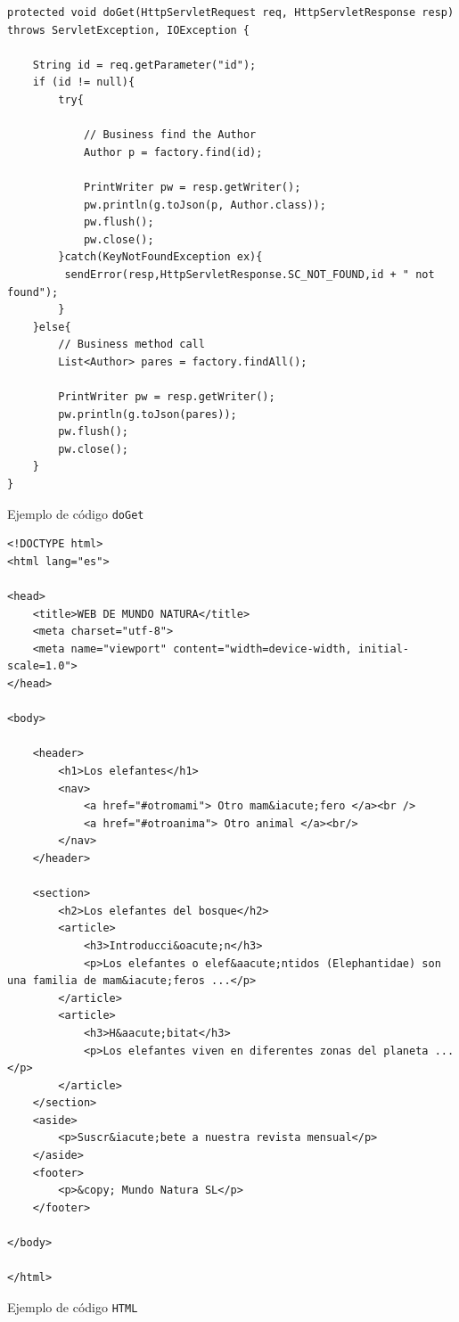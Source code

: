 \documentclass{twcam-entregable}
\begin{document}
\begin{listing}[h!t!]
\begin{verbatim}
protected void doGet(HttpServletRequest req, HttpServletResponse resp) throws ServletException, IOException {

    String id = req.getParameter("id");
    if (id != null){
        try{

            // Business find the Author
            Author p = factory.find(id);
            
            PrintWriter pw = resp.getWriter();
            pw.println(g.toJson(p, Author.class));
            pw.flush();
            pw.close();
        }catch(KeyNotFoundException ex){
         sendError(resp,HttpServletResponse.SC_NOT_FOUND,id + " not found");
        }
    }else{
        // Business method call
        List<Author> pares = factory.findAll();

        PrintWriter pw = resp.getWriter();
        pw.println(g.toJson(pares));
        pw.flush();
        pw.close();
    }
}
\end{verbatim}
 \captionsetup{type=lstlisting}
\caption{Ejemplo de código \texttt{doGet}}
\label{lst:java}
\end{listing}

\begin{listing}[h!t!]
\begin{verbatim}
<!DOCTYPE html>
<html lang="es">

<head>
    <title>WEB DE MUNDO NATURA</title>
    <meta charset="utf-8">
    <meta name="viewport" content="width=device-width, initial-scale=1.0">
</head>

<body>

    <header>
        <h1>Los elefantes</h1>
        <nav>
            <a href="#otromami"> Otro mam&iacute;fero </a><br />
            <a href="#otroanima"> Otro animal </a><br/>
        </nav>
    </header>

    <section>
        <h2>Los elefantes del bosque</h2>
        <article>
            <h3>Introducci&oacute;n</h3>
            <p>Los elefantes o elef&aacute;ntidos (Elephantidae) son una familia de mam&iacute;feros ...</p>
        </article>
        <article>
            <h3>H&aacute;bitat</h3>
            <p>Los elefantes viven en diferentes zonas del planeta ...</p>
        </article>
    </section>
    <aside>
        <p>Suscr&iacute;bete a nuestra revista mensual</p>
    </aside>
    <footer>
        <p>&copy; Mundo Natura SL</p>
    </footer>
    
</body>

</html>
\end{verbatim}
 \captionsetup{type=lstlisting}
\caption{Ejemplo de código {\tt HTML}}
\label{lst:html}
\end{listing}
\end{document}
